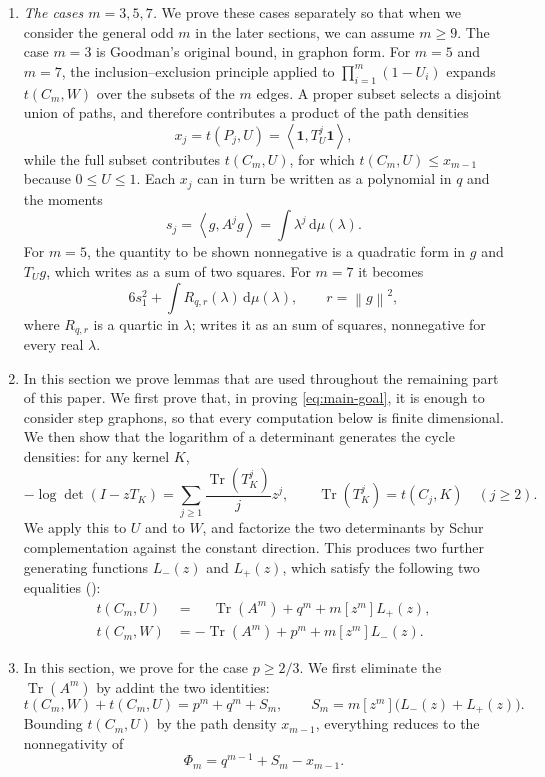 \documentclass[11pt]{article}
\numberwithin{equation}{section}
\newcommand{\one}{\mathbf 1}
\newcommand{\ip}[2]{\left\langle #1,#2\right\rangle}
\newcommand{\norm}[1]{\left\lVert #1\right\rVert}
\newcommand{\Tr}{\operatorname{Tr}}
\newcommand{\dd}{\,\mathrm d}
\begin{document}
\begin{enumerate}[label=\textbf{Section \arabic*.},leftmargin=4.6em,start=2]
  \item \emph{The cases $m=3,5,7$.}  We prove these cases separately so that when we consider the general odd $m$ in the later sections, we can assume $m\ge9$.
  The case $m=3$ is Goodman's original bound, in graphon form.  For
  $m=5$ and $m=7$, the inclusion--exclusion principle applied to
  $\prod_{i=1}^m(1-U_i)$ expands $t(C_m,W)$ over the subsets of the
  $m$ edges.  A proper subset selects a disjoint union of paths, and
  therefore contributes a product of the path densities
  \[
    x_j=t(P_j,U)=\ip\one{T_U^j\one},
  \]
  while the full subset contributes $t(C_m,U)$, for which
  $t(C_m,U)\le x_{m-1}$ because $0\le U\le1$.  Each $x_j$ can in turn
  be written as a polynomial in $q$ and the moments
  \[
    s_j=\ip g{A^jg}=\int\lambda^j\dd\mu(\lambda).
  \]
  For $m=5$, the quantity to be shown nonnegative is a quadratic form
  in $g$ and $T_Ug$, which  writes as a sum of two
  squares.  For $m=7$ it becomes
  \[
    6s_1^2+\int R_{q,r}(\lambda)\dd\mu(\lambda),
    \qquad r=\norm g^2,
  \]
  where $R_{q,r}$ is a quartic in $\lambda$;  writes it
  as an sum of squares, nonnegative for every real $\lambda$.

  \item 
  In this section we prove lemmas that are used throughout the remaining part
  of this paper.  We first prove that, in proving \eqref{eq:main-goal}, it is
  enough to consider step graphons, so that every computation below is finite
  dimensional.  We then show that the logarithm of a determinant generates
  the cycle densities: for any kernel $K$,
  \[
    -\log\det(I-zT_K)=\sum_{j\ge1}\frac{\Tr(T_K^j)}{j}z^j,
    \qquad
    \Tr(T_K^j)=t(C_j,K)\quad(j\ge2).
  \]
  We apply this to $U$ and to $W$, and factorize the two determinants by
  Schur complementation against the constant direction.  This produces two
  further generating functions $L_-(z)$ and $L_+(z)$, which satisfy the
  following two equalities ():
  \begin{align*}
    t(C_m,U)&=\phantom{-}\Tr(A^m)+q^m+m[z^m]L_+(z),\\
    t(C_m,W)&=-\Tr(A^m)+p^m+m[z^m]L_-(z).
  \end{align*}
  \item In this section, we prove  for the case $p \ge 2/3$. We first eliminate the $\Tr(A^m)$ by addint the two identities:
  \[
    t(C_m,W)+t(C_m,U)=p^m+q^m+S_m,
    \qquad
    S_m=m[z^m]\bigl(L_-(z)+L_+(z)\bigr).
  \]
  Bounding $t(C_m,U)$ by the path density $x_{m-1}$, everything reduces to
  the nonnegativity of
  \[
    \Phi_m=q^{m-1}+S_m-x_{m-1}.
  \]


\end{enumerate}
\end{document}
